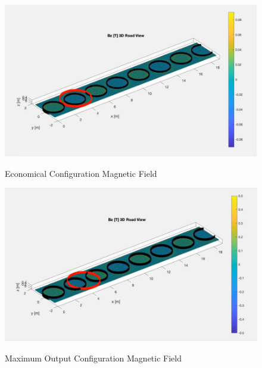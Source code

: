 \begin{figure}
    \begin{center}
    \includegraphics[width=5in]{fig32.png}
    \end{center}
    \renewcommand{\baselinestretch}{1}
    \small\normalsize
    \begin{quote}
    \caption[Economical Configuration Magnetic Field]{Economical Configuration Magnetic Field} \label{fig: f32}
    \end{quote}
\end{figure}

\begin{figure}
    \begin{center}
    \includegraphics[width=5in]{fig33.png}
    \end{center}
    \renewcommand{\baselinestretch}{1}
    \small\normalsize
    \begin{quote}
    \caption[Maximum Output Configuration Magnetic Field]{Maximum Output Configuration Magnetic Field} \label{fig: f33}
    \end{quote}
\end{figure}

